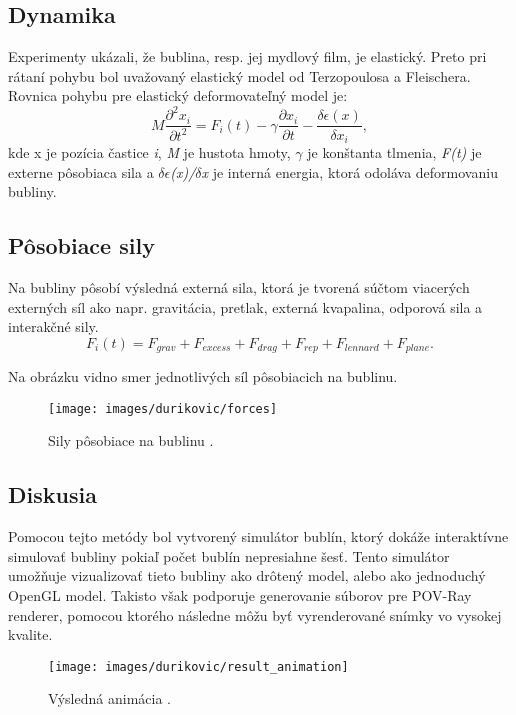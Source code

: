 \subsection{Dynamika}

Experimenty ukázali, že bublina, resp. jej mydlový film, je elastický. Preto pri rátaní pohybu bol uvažovaný elastický model od Terzopoulosa a Fleischera. Rovnica pohybu pre elastický deformovateľný model je:
\begin{equation}
	M\frac{\partial^{2} x_{i}}{\partial t^{2}} = F_{i}(t)-\gamma\frac{\partial x_{i}}{\partial t}-\frac{\delta \epsilon (x)}{\delta x_{i}},
\end{equation}
kde x je pozícia častice \textit{i}, \textit{M} je hustota hmoty, \textit{$\gamma$} je konštanta tlmenia, \textit{F(t)} je externe pôsobiaca sila a \textit{$\delta \epsilon$(x)/$\delta$x}  je interná energia, ktorá odoláva deformovaniu bubliny.

\subsection{Pôsobiace sily}

Na bubliny pôsobí výsledná externá sila, ktorá je tvorená súčtom viacerých externých síl ako napr. gravitácia, pretlak, externá kvapalina, odporová sila a interakčné sily.
\begin{equation}
	F_{i}(t)=F_{grav}+F_{excess}+F_{drag}+F_{rep}+F_{lennard}+F_{plane}.	
\end{equation}
\begin{minipage}{\linewidth}
	Na obrázku  vidno smer jednotlivých síl pôsobiacich na bublinu.
	\begin{figure}[H]
		\begin{center}
			\texttt{[image: images/durikovic/forces]}
			\caption{Sily pôsobiace na bublinu \cite{durikovic2001}.}
			\label{img:forces}
		\end{center}
	\end{figure}
\end{minipage}

\subsection{Diskusia}

Pomocou tejto metódy bol vytvorený simulátor bublín, ktorý dokáže interaktívne simulovať bubliny pokiaľ počet bublín nepresiahne šesť. Tento simulátor umožňuje vizualizovať tieto bubliny ako drôtený model, alebo ako jednoduchý OpenGL model. Takisto však podporuje generovanie súborov pre POV-Ray renderer, pomocou ktorého následne môžu byť vyrenderované snímky vo vysokej kvalite.
\begin{figure}[H]
	\begin{center}
		\texttt{[image: images/durikovic/result\_animation]}
		\caption{Výsledná animácia \cite{durikovic2001}.}
	\end{center}
\end{figure}

